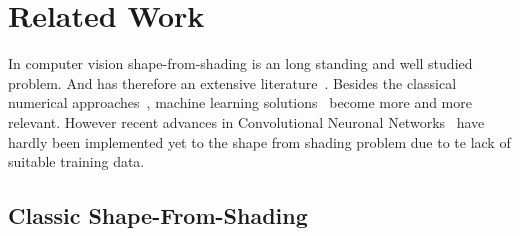 \chapter{Related Work}
	In computer vision shape-from-shading is an long standing and well studied problem. And has therefore an extensive literature~\cite{Shape_from_shading_A_survey, Perceiving_Shape_from_Shading}. Besides the classical numerical approaches~\cite{Numerical_methods_for_shape_from_shading}, machine learning solutions~\cite{Training_many_parameter_shape_from_shading_models, A_neural_network_approach_for_shape_from_shading} become more and more relevant. However recent advances in Convolutional Neuronal Networks~\cite{ImageNet_Deep_Convolutional_Neural_Networks} have hardly been implemented yet to the shape from shading problem due to te lack of suitable training data.
	
\section{Classic Shape-From-Shading}
\label{sec:relwork:SFS}

